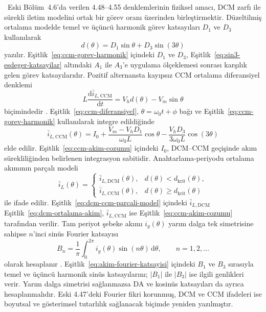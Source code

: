 \eskitezetiketi\ Eski Bölüm~4.6'da verilen 4.48--4.55 denklemlerinin fiziksel amacı, DCM zarfı ile sürekli iletim modelini ortak bir görev oranı üzerinden birleştirmektir. Düzeltilmiş ortalama modelde temel ve üçüncü harmonik görev katsayıları $D_1$ ve $D_3$ kullanılarak
\begin{equation}
  d(\theta)=D_1\sin\theta+D_3\sin(3\theta)
  \label{eq:ccm-gorev-harmonik}
\end{equation}
yazılır. Eşitlik~\eqref{eq:ccm-gorev-harmonik} içindeki $D_1$ ve $D_3$, Eşitlik~\eqref{eq:sin3-esdeger-katsayilar} altındaki $A_1$ ile $A_3$'e uygulama ölçeklemesi sonrası karşılık gelen görev katsayılarıdır. Pozitif alternansta kayıpsız CCM ortalama diferansiyel denklemi
\begin{equation}
  L\frac{\mathrm{d}\bar i_{L,\mathrm{CCM}}}{\mathrm{d}t}
  =V_h d(\theta)-V_m\sin\theta
  \label{eq:ccm-diferansiyel}
\end{equation}
biçimindedir \citep{Erickson2001,Mohan2003}. Eşitlik~\eqref{eq:ccm-diferansiyel}, $\theta=\omega_0t+\phi$ bağı ve Eşitlik~\eqref{eq:ccm-gorev-harmonik} kullanılarak integre edildiğinde
\begin{equation}
  \bar i_{L,\mathrm{CCM}}(\theta)
  = I_0+\frac{V_m-V_hD_1}{\omega_0L}\cos\theta
  -\frac{V_hD_3}{3\omega_0L}\cos(3\theta)
  \label{eq:ccm-akim-cozumu}
\end{equation}
elde edilir. Eşitlik~\eqref{eq:ccm-akim-cozumu} içindeki $I_0$, DCM--CCM geçişinde akım sürekliliğinden belirlenen integrasyon sabitidir. Anahtarlama-periyodu ortalama akımının parçalı modeli
\begin{equation}
  \bar i_L(\theta)=
  \begin{cases}
    \bar i_{L,\mathrm{DCM}}(\theta), & d(\theta)<d_{\mathrm{krit}}(\theta),\\
    \bar i_{L,\mathrm{CCM}}(\theta), & d(\theta)\geq d_{\mathrm{krit}}(\theta)
  \end{cases}
  \label{eq:dcm-ccm-parcali-model}
\end{equation}
ile ifade edilir. Eşitlik~\eqref{eq:dcm-ccm-parcali-model} içindeki $\bar i_{L,\mathrm{DCM}}$ Eşitlik~\eqref{eq:dcm-ortalama-akim}, $\bar i_{L,\mathrm{CCM}}$ ise Eşitlik~\eqref{eq:ccm-akim-cozumu} tarafından verilir. Tam periyot şebeke akımı $i_g(\theta)$ yarım dalga tek simetrisine sahipse $n$'inci sinüs Fourier katsayısı
\begin{equation}
  B_n=\frac{1}{\pi}\int_0^{2\pi}i_g(\theta)\sin(n\theta)\,\mathrm{d}\theta,
  \qquad n=1,2,\ldots
  \label{eq:akim-fourier-katsayisi}
\end{equation}
olarak hesaplanır \citep{Oppenheim1997}. Eşitlik~\eqref{eq:akim-fourier-katsayisi} içindeki $B_1$ ve $B_3$ sırasıyla temel ve üçüncü harmonik sinüs katsayılarını; $|B_1|$ ile $|B_3|$ ise ilgili genlikleri verir. Yarım dalga simetrisi sağlanmazsa DA ve kosinüs katsayıları da ayrıca hesaplanmalıdır. Eski 4.47'deki Fourier fikri korunmuş, DCM ve CCM ifadeleri ise boyutsal ve gösterimsel tutarlılık sağlanacak biçimde yeniden yazılmıştır.

